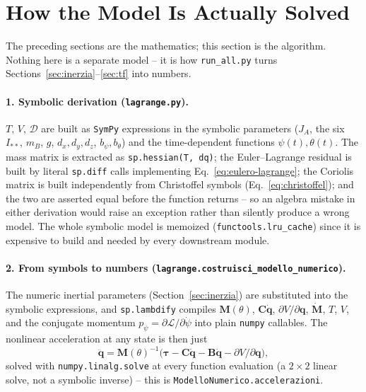 \documentclass[11pt,a4paper]{article}
\numberwithin{equation}{section}
\newcommand{\bs}[1]{\boldsymbol{#1}}
\begin{document}
\section{How the Model Is Actually Solved}
\label{sec:come-si-risolve}

The preceding sections are the mathematics; this section is the algorithm. Nothing here is a separate model -- it is how \texttt{run\_all.py} turns Sections~\ref{sec:inerzia}--\ref{sec:tf} into numbers.

\paragraph{1. Symbolic derivation (\texttt{lagrange.py}).} $T$, $V$, $\mathcal D$ are built as \texttt{SymPy} expressions in the symbolic parameters ($J_A$, the six $I_{**}$, $m_B$, $g$, $d_x,d_y,d_z$, $b_\psi,b_\theta$) and the time-dependent functions $\psi(t),\theta(t)$. The mass matrix is extracted as \texttt{sp.hessian(T, dq)}; the Euler--Lagrange residual is built by literal \texttt{sp.diff} calls implementing Eq.~\eqref{eq:eulero-lagrange}; the Coriolis matrix is built independently from Christoffel symbols (Eq.~\eqref{eq:christoffel}); and the two are asserted equal before the function returns -- so an algebra mistake in either derivation would raise an exception rather than silently produce a wrong model. The whole symbolic model is memoized (\texttt{functools.lru\_cache}) since it is expensive to build and needed by every downstream module.

\paragraph{2. From symbols to numbers (\texttt{lagrange.\allowbreak costruisci\_\allowbreak modello\_\allowbreak numerico}).} The numeric inertial parameters (Section~\ref{sec:inerzia}) are substituted into the symbolic expressions, and \texttt{sp.lambdify} compiles $\bs M(\theta)$, $\bs C\dot{\bs q}$, $\partial V/\partial\bs q$, $\dot{\bs M}$, $T$, $V$, and the conjugate momentum $p_\psi=\partial\mathcal L/\partial\dot\psi$ into plain \texttt{numpy} callables. The nonlinear acceleration at any state is then just
\begin{equation}
\ddot{\bs q} = \bs M(\theta)^{-1}\big(\bs\tau - \bs C\dot{\bs q} - \bs B\dot{\bs q} - \partial V/\partial\bs q\big),
\end{equation}
solved with \texttt{numpy.linalg.solve} at every function evaluation (a $2\times2$ linear solve, not a symbolic inverse) -- this is \texttt{ModelloNumerico.accelerazioni}.
\end{document}
